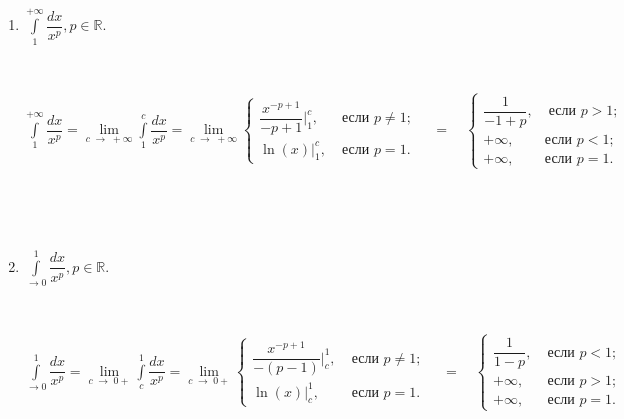 \documentclass[../main.tex]{subfiles}
\begin{document}
\begin{example}

    ~
    
    \begin{enumerate}
        \item \( \displaystyle\int\limits_{ 1}^{ +\infty} \dfrac{ dx}{ x^p}, p \in \mathbb{R}.\)
        
        ~

        \( \displaystyle\int\limits_{ 1}^{ +\infty} \dfrac{ dx}{ x^p} = \lim\limits_{ c \; \rightarrow \; +\infty} \displaystyle\int\limits_{ 1}^{ c} \dfrac{ dx}{ x^p} = \lim\limits_{ c \; \rightarrow \; +\infty} 
        \displaystyle\begin{cases}
            \dfrac{x^{-p + 1} }{ -p + 1} \bigg|_1^c, & \; \text{если } p \neq 1; \\
            \ln(x) \bigg|_1^c, & \; \text{если } p = 1.
        \end{cases}
       \quad =\quad 
       \begin{cases}
        \dfrac{ 1}{ -1 + p}, & \; \text{если } p > 1; \\
        +\infty, & \text{если } p < 1; \\
        +\infty, & \text{если } p = 1. 
       \end{cases}
        \)

        ~
       
        
        ~

        \item \( \displaystyle\int\limits_{ \rightarrow 0}^{ 1} \dfrac{ dx}{ x^p}, p \in \mathbb{R}. \)
        
        ~

        \( \displaystyle\int\limits_{ \rightarrow 0}^{ 1} \dfrac{ dx}{ x^p} = \lim\limits_{ c \; \rightarrow \; 0+} \displaystyle\int\limits_{ c}^{ 1} \dfrac{ dx}{ x^p} = \lim\limits_{ c \; \rightarrow \; 0+} 
        \begin{cases}
            \dfrac{ x^{-p + 1}}{ -(p - 1)} \bigg|_c^1, & \; \text{если } p \neq 1; \\
            \ln(x) \bigg|_c^1, & \; \text{если } p = 1.
        \end{cases}
        \quad =\quad
        \begin{cases}
            \dfrac{ 1}{ 1 - p}, & \; \text{если } p < 1; \\
            +\infty, & \; \text{если } p > 1; \\
            +\infty, & \; \text{если } p = 1.
        \end{cases}
        \)

        ~

    \end{enumerate}
\end{example}
\end{document}
